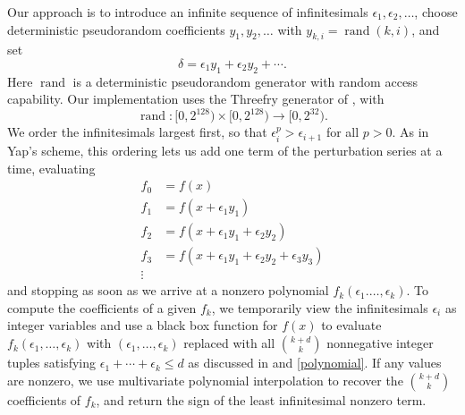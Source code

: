 \documentclass[11pt]{article}
\newcommand{\rand}{\operatorname{rand}}
\begin{document}
Our approach is to introduce an infinite sequence of infinitesimals $\epsilon_1, \epsilon_2, \ldots$, choose deterministic pseudorandom coefficients $y_1, y_2, \ldots$
with $y_{k,i} = \rand(k,i)$, and set
$$\delta = \epsilon_1 y_1 + \epsilon_2 y_2 + \cdots.$$
Here $\rand$ is a deterministic pseudorandom generator with random access capability.  Our implementation uses the Threefry generator of
\cite{salmon2011random}, with
$$\rand : [0,2^{128}) \times [0,2^{128}) \to [0,2^{32}).$$
We order the infinitesimals largest first, so that $\epsilon_i^p > \epsilon_{i+1}$ for all $p > 0$.  As in Yap's scheme, this ordering lets us add one term of the
perturbation series at a time, evaluating
\begin{align*}
f_0 &= f(x) \\
f_1 &= f(x + \epsilon_1 y_1) \\
f_2 &= f(x + \epsilon_1 y_1 + \epsilon_2 y_2) \\
f_3 &= f(x + \epsilon_1 y_1 + \epsilon_2 y_2 + \epsilon_3 y_3) \\
\vdots
\end{align*}
and stopping as soon as we arrive at a nonzero polynomial $f_k(\epsilon_1. \ldots, \epsilon_k)$.
To compute the coefficients of a given $f_k$, we temporarily view the infinitesimals $\epsilon_i$ as integer variables and use a black box function for $f(x)$ to evaluate
$f_k(\epsilon_1, \ldots, \epsilon_k)$ with $(\epsilon_1, \ldots, \epsilon_k)$ replaced with all $\binom{k+d}{k}$ nonnegative integer tuples satisfying $\epsilon_1 + \cdots + \epsilon_k \le d$
as discussed in \cite{neidinger2009multivariable} and \autoref{polynomial}.
If any values are nonzero, we use multivariate polynomial interpolation to recover the $\binom{k+d}{k}$ coefficients of $f_k$, and return the sign of the least infinitesimal nonzero term.
\end{document}

